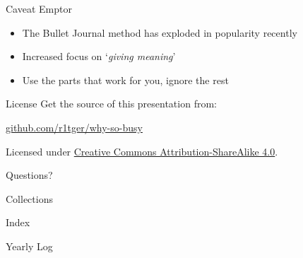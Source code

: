\documentclass[aspectratio=169]{beamer}
\begin{document}
    {
    \begin{frame}{Caveat Emptor}
        \begin{itemize}
            \item The Bullet Journal method has exploded in popularity recently
            \item Increased focus on `\emph{giving meaning}'
            \item Use the parts that work for you, ignore the rest
        \end{itemize}
    \end{frame}
    }

    \begin{frame}{License}
        Get the source of this presentation from:
        \begin{center}\url{github.com/r1tger/why-so-busy}\end{center}
        Licensed under \href{http://creativecommons.org/licenses/by-sa/4.0/}{Creative Commons Attribution-ShareAlike 4.0}.
        \begin{center}\ccbysa\end{center}
    \end{frame}

    \begin{frame}[standout]
        Questions?
    \end{frame}

    \appendix

    \begin{frame}{Collections}
    \end{frame}

    {
    \begin{frame}{Index}
    \end{frame}
    }

    \begin{frame}{Yearly Log}
    \end{frame}
\end{document}
